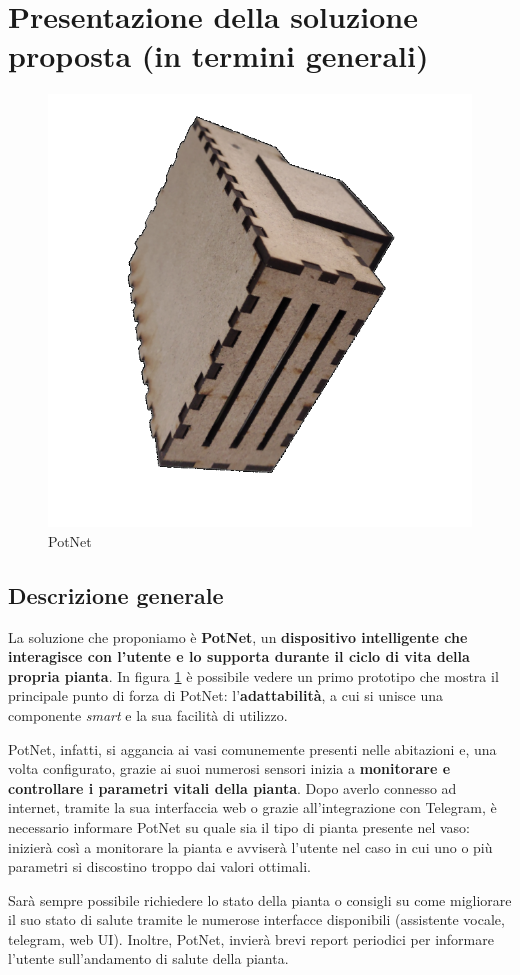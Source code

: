 \newpage
\section{Presentazione della soluzione proposta (in termini generali)}

\begin{figure}
	\centering
	\vspace{-15mm}
	\includegraphics[width=.4\textwidth]{images/potnet.png}
	\vspace{-7mm}
	\caption{PotNet}
	\vspace{-5mm}
	\label{fig:potnet}
\end{figure}

\subsection{Descrizione generale}

La soluzione che proponiamo è \textbf{PotNet}, un \textbf{dispositivo intelligente che interagisce con l'utente e lo supporta durante il ciclo di vita della propria pianta}. In figura \ref{fig:potnet} è possibile vedere un primo prototipo che mostra il principale punto di forza di PotNet: l'\textbf{adattabilità}, a cui si unisce una componente \textit{smart} e la sua facilità di utilizzo.

PotNet, infatti, si aggancia ai vasi comunemente presenti nelle abitazioni e, una volta configurato, grazie ai suoi numerosi sensori inizia a \textbf{monitorare e controllare i parametri vitali della pianta}.
Dopo averlo connesso ad internet, tramite la sua interfaccia web o grazie all'integrazione con Telegram, è necessario informare PotNet su quale sia il tipo di pianta presente nel vaso: inizierà così a monitorare la pianta e avviserà l'utente nel caso in cui uno o più parametri si discostino troppo dai valori ottimali.

Sarà sempre possibile richiedere lo stato della pianta o consigli su come migliorare il suo stato di salute tramite le numerose interfacce disponibili (assistente vocale, telegram, web UI). Inoltre, PotNet, invierà brevi report periodici per informare l'utente sull'andamento di salute della pianta.

